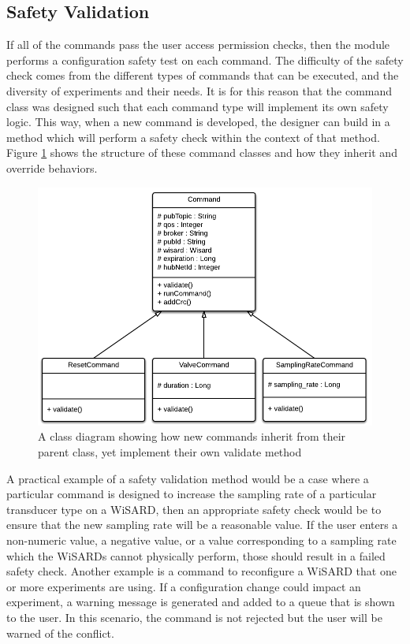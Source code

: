\subsection{Safety Validation}
 If all of the commands pass the user access permission checks, then the module performs a configuration safety test on each command. The difficulty of the safety check comes from the different types of commands that can be executed, and the diversity of experiments and their needs. It is for this reason that the command class was designed such that each command type will implement its own safety logic. This way, when a new command is developed, the designer can build in a method which will perform a safety check within the context of that method. Figure \ref{fig:cmd_classes} shows the structure of these command classes and how they inherit and override behaviors.\\
 
\begin{figure}[H]
	\centering
	\includegraphics[width=\textwidth]{figures/command_class_diagram.png}
	\caption{A class diagram showing how new commands inherit from their parent class, yet implement their own validate method}
	\label{fig:cmd_classes}
\end{figure}
 
 A practical example of a safety validation method would be a case where a particular command is designed to increase the sampling rate of a particular transducer type on a WiSARD, then an appropriate safety check would be to ensure that the new sampling rate will be a reasonable value. If the user enters a non-numeric value, a negative value, or a value corresponding to a sampling rate which the WiSARDs cannot physically perform, those should result in a failed safety check. Another example is a command to reconfigure a WiSARD that one or more experiments are using. If a configuration change could impact an experiment, a warning message is generated and added to a queue that is shown to the user. In this scenario, the command is not rejected but the user will be warned of the conflict. 

